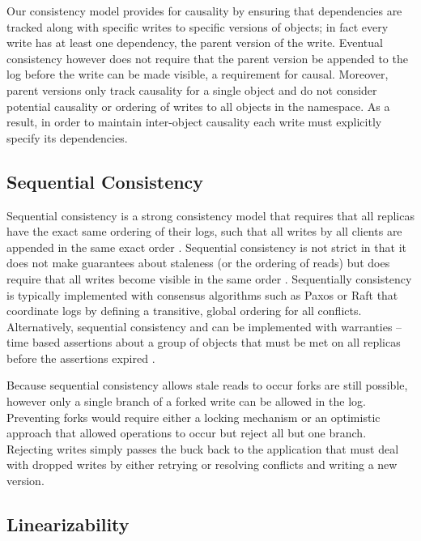 \documentclass[10pt,conference,letterpaper]{IEEEtran}
\begin{document}
Our consistency model provides for causality by ensuring that dependencies are tracked along with specific writes to specific versions of objects; in fact every write has at least one dependency, the parent version of the write. Eventual consistency however does not require that the parent version be appended to the log before the write can be made visible, a requirement for causal. Moreover, parent versions only track causality for a single object and do not consider potential causality or ordering of writes to all objects in the namespace. As a result, in order to maintain inter-object causality each write must explicitly specify its dependencies.

\subsection{Sequential Consistency}

Sequential consistency is a strong consistency model that requires that all replicas have the exact same ordering of their logs, such that all writes by all clients are appended in the same exact order \cite{attiya_sequential_1994}. Sequential consistency is not strict in that it does not make guarantees about staleness (or the ordering of reads) but does require that all writes become visible in the same order \cite{bermbach_consistency_2013}. Sequentially consistency is typically implemented with consensus algorithms such as Paxos \cite{lamport_fast_2006} or Raft \cite{ongaro_search_2014} that coordinate logs by defining a transitive, global ordering for all conflicts. Alternatively, sequential consistency and can be implemented with warranties -- time based assertions about a group of objects that must be met on all replicas before the assertions expired \cite{liu_warranties_2014}.

Because sequential consistency allows stale reads to occur forks are still possible, however only a single branch of a forked write can be allowed in the log. Preventing forks would require either a locking mechanism or an optimistic approach that allowed operations to occur but reject all but one branch. Rejecting writes simply passes the buck back to the application that must deal with dropped writes by either retrying or resolving conflicts and writing a new version.

\subsection{Linearizability}
\end{document}
